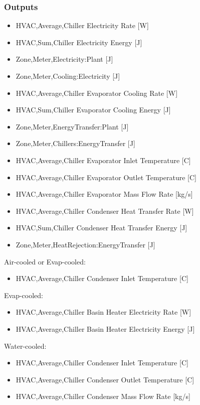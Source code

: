 \subsubsection{Outputs}\label{outputs-2-015}

\begin{itemize}
\item
  HVAC,Average,Chiller Electricity Rate {[}W{]}
\item
  HVAC,Sum,Chiller Electricity Energy {[}J{]}
\item
  Zone,Meter,Electricity:Plant {[}J{]}
\item
  Zone,Meter,Cooling:Electricity {[}J{]}
\item
  HVAC,Average,Chiller Evaporator Cooling Rate {[}W{]}
\item
  HVAC,Sum,Chiller Evaporator Cooling Energy {[}J{]}
\item
  Zone,Meter,EnergyTransfer:Plant {[}J{]}
\item
  Zone,Meter,Chillers:EnergyTransfer {[}J{]}
\item
  HVAC,Average,Chiller Evaporator Inlet Temperature {[}C{]}
\item
  HVAC,Average,Chiller Evaporator Outlet Temperature {[}C{]}
\item
  HVAC,Average,Chiller Evaporator Mass Flow Rate {[}kg/s{]}
\item
  HVAC,Average,Chiller Condenser Heat Transfer Rate {[}W{]}
\item
  HVAC,Sum,Chiller Condenser Heat Transfer Energy {[}J{]}
\item
  Zone,Meter,HeatRejection:EnergyTransfer {[}J{]}
\end{itemize}

Air-cooled or Evap-cooled:

\begin{itemize}
\tightlist
\item
  HVAC,Average,Chiller Condenser Inlet Temperature {[}C{]}
\end{itemize}

Evap-cooled:

\begin{itemize}
\item
  HVAC,Average,Chiller Basin Heater Electricity Rate {[}W{]}
\item
  HVAC,Average,Chiller Basin Heater Electricity Energy {[}J{]}
\end{itemize}

Water-cooled:

\begin{itemize}
\item
  HVAC,Average,Chiller Condenser Inlet Temperature {[}C{]}
\item
  HVAC,Average,Chiller Condenser Outlet Temperature {[}C{]}
\item
  HVAC,Average,Chiller Condenser Mass Flow Rate {[}kg/s{]}
\end{itemize}


